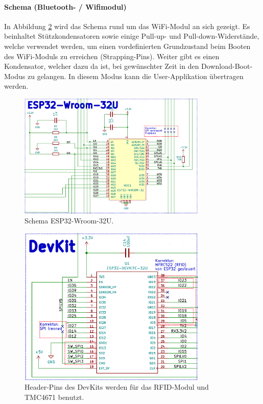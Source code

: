 \paragraph{Schema (Bluetooth- / Wifimodul)}\mbox{}

In Abbildung \ref{fig:Schema_ESP32} wird das Schema rund um das WiFi-Modul an sich gezeigt. Es beinhaltet Stützkondensatoren sowie einige Pull-up- und Pull-down-Widerstände, welche verwendet werden, um einen vordefinierten Grundzustand beim Booten des WiFi-Moduls zu erreichen (Strapping-Pins). Weiter gibt es einen Kondensator, welcher dazu da ist, bei gewünschter Zeit in den Download-Boot-Modus zu gelangen. In diesem Modus kann die User-Applikation übertragen werden.

\begin{figure}[H]
	\centering
	\includegraphics[width=0.8\textwidth]{graphics/Schema_ESP32}
	\caption{Schema ESP32-Wroom-32U.}
	\label{fig:Schema_ESP32}
\end{figure}

\begin{figure}[H]
	\centering
	\includegraphics[width=0.8\textwidth]{graphics/Schema_ESP32_Devkit}
	\caption{Header-Pins des DevKits werden für das RFID-Modul und TMC4671 benutzt.}
	\label{fig:Schema_ESP32}
\end{figure}

